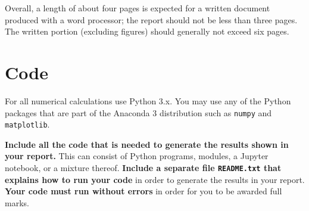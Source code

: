 \documentclass[letterpaper]{scrartcl}
\begin{document}
Overall, a length of about four pages is expected for a written
document produced with a word processor; the report should
not be less than three pages. The written portion (excluding figures)
should generally not exceed six pages.

\section{Code}
\label{sec:code}

For all numerical calculations use Python 3.x. You may use any of the
Python packages that are part of the Anaconda 3 distribution such as
\texttt{numpy} and \texttt{matplotlib}. 

\textbf{Include all the code that is needed to generate the results
  shown in your report.} This can consist of Python programs, modules,
a Jupyter notebook, or a mixture thereof. \textbf{Include a separate
  file \texttt{README.txt} that explains how to run your code} in
order to generate the results in your report. \textbf{Your code must
  run without errors} in order for you to be awarded full marks.
\end{document}
